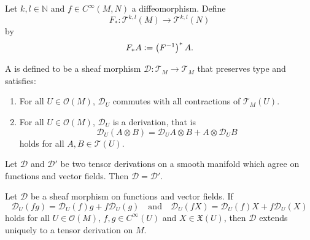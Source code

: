 \begin{definition}[Pushforward]
	Let $k,l \in \mathbb{N}$ and $f \in C^\infty(M,N)$ a diffeomorphism. Define 
	\begin{equation*}
		F_* : \mathcal{T}^{k,l}(M) \to \mathcal{T}^{k,l}(N)
	\end{equation*}
	\noindent by
	\begin{equation*}
		F_*A := \del[1]{F^{-1}}^*A.
	\end{equation*}
\end{definition}

\begin{definition}
	A  is defined to be a sheaf morphism $\mathcal{D} : \mathcal{T}_M \to \mathcal{T}_M$ that preserves type and satisfies:
	\begin{enumerate}[label = \textup{(\roman*)},leftmargin=*]
		\item For all $U \in \mathcal{O}(M)$, $\mathcal{D}_U$ commutes with all contractions of $\mathcal{T}_M(U)$.
		\item For all $U \in \mathcal{O}(M)$, $\mathcal{D}_U$ is a derivation, that is
			\begin{equation*}
				\mathcal{D}_U(A \otimes B) = \mathcal{D}_UA \otimes B + A \otimes \mathcal{D}_UB
			\end{equation*}
			\noindent holds for all $A,B \in \mathcal{T}(U)$.
	\end{enumerate}
\end{definition}

\begin{proposition}
	Let $\mathcal{D}$ and $\mathcal{D}'$ be two tensor derivations on a smooth manifold which agree on functions and vector fields. Then $\mathcal{D} = \mathcal{D}'$.
\end{proposition}

\begin{proposition}
	\label{prop:constructing_tensor_derivation}
	Let $\mathcal{D}$ be a sheaf morphism on functions and vector fields. If 
	\begin{equation*}
		\mathcal{D}_U(fg) = \mathcal{D}_U(f)g + f\mathcal{D}_U(g) \quad \text{and} \quad \mathcal{D}_U(fX) = \mathcal{D}_U(f)X + f\mathcal{D}_U(X)
	\end{equation*}
	\noindent holds for all $U \in \mathcal{O}(M)$, $f,g \in C^\infty(U)$ and $X \in \mathfrak{X}(U)$, then $\mathcal{D}$ extends uniquely to a tensor derivation on $M$.
\end{proposition}

